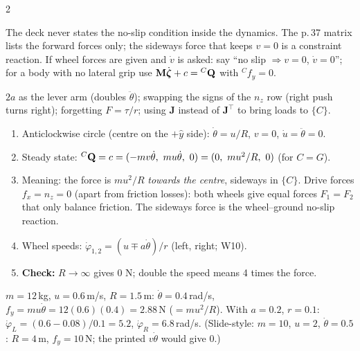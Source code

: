\begin{multicols}{2}
\begin{worked}
\end{worked}
\begin{slideerr}
The deck never states the no-slip condition inside the dynamics. The p.\,37 matrix lists the forward forces only; the sideways force that keeps $v=0$ is a constraint reaction. If wheel forces are given and $\dot v$ is asked: say ``no slip $\Rightarrow v=0$, $\dot v=0$''; for a body with no lateral grip use $\mathbf M\dot{\boldsymbol\zeta}+c={}^{C}\mathbf Q$ with ${}^Cf_y=0$.
\end{slideerr}
\begin{trap}
$2a$ as the lever arm (doubles $\ddot\theta$); swapping the signs of the $n_z$ row (right push turns right); forgetting $F=\tau/r$; using $\mathbf J$ instead of $\mathbf J^\top$ to bring loads to $\{C\}$.
\end{trap}

\columnbreak
{}
\begin{recipe}
\begin{enumerate}
\item Anticlockwise circle (centre on the $+\hat y$ side): $\dot\theta=u/R$, $v=0$, $\dot u=\ddot\theta=0$.
\item Steady state: $\wEQC=c=(-mv\dot\theta,\ mu\dot\theta,\ 0)=(0,\ mu^2/R,\ 0)$ (for $C=G$).
\item Meaning: the force is $mu^2/R$ \emph{towards the centre}, sideways in $\{C\}$. Drive forces $f_x=n_z=0$ (apart from friction losses): both wheels give equal forces $F_1=F_2$ that only balance friction. The sideways force is the wheel--ground no-slip reaction.
\item Wheel speeds: $\dot\varphi_{1,2}=(u\mp a\dot\theta)/r$ (left, right; W10).
\item \textbf{Check:} $R\to\infty$ gives $0$ N; double the speed means 4 times the force.
\end{enumerate}
\end{recipe}
\begin{worked}
$m=12$\,kg, $u=0.6$\,m/s, $R=1.5$\,m: $\dot\theta=0.4$\,rad/s, $f_y=mu\dot\theta=12(0.6)(0.4)=\mathbf{2.88}$\,N ($=mu^2/R$). With $a=0.2$, $r=0.1$: $\dot\varphi_L=(0.6-0.08)/0.1=\mathbf{5.2}$, $\dot\varphi_R=\mathbf{6.8}$\,rad/s. (Slide-style: $m=10$, $u=2$, $\dot\theta=0.5$: $R=4$\,m, $f_y=10$\,N; the printed $v\dot\theta$ would give $0$.) \chk
\end{worked}


\end{multicols}
